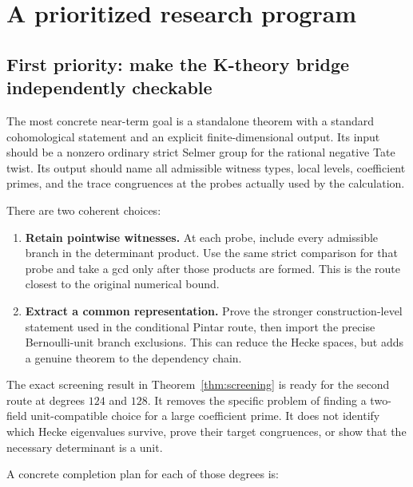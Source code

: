 \section{A prioritized research program}

\subsection{First priority: make the K-theory bridge independently checkable}

The most concrete near-term goal is a standalone theorem with a standard
cohomological statement and an explicit finite-dimensional output. Its
input should be a nonzero ordinary strict Selmer group for the rational
negative Tate twist. Its output should name all admissible witness
types, local levels, coefficient primes, and the trace congruences
at the probes actually used by the calculation.

There are two coherent choices:

\begin{enumerate}
\item \textbf{Retain pointwise witnesses.} At each probe, include
every admissible branch in the determinant product. Use the same
strict comparison for that probe and take a gcd only after those
products are formed. This is the route closest to the original
numerical bound.
\item \textbf{Extract a common representation.} Prove the stronger
construction-level statement used in the conditional Pintar route,
then import the precise Bernoulli-unit branch exclusions. This
can reduce the Hecke spaces, but adds a genuine theorem to the
dependency chain.
\end{enumerate}

The exact screening result in Theorem~\ref{thm:screening} is ready
for the second route at degrees $124$ and $128$. It removes the
specific problem of finding a two-field unit-compatible choice
for a large coefficient prime. It does not identify which
Hecke eigenvalues survive, prove their target congruences, or
show that the necessary determinant is a unit.

A concrete completion plan for each of those degrees is:

